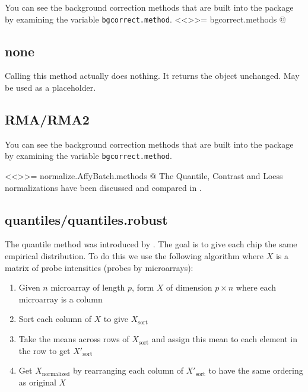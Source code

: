 You can see the background correction methods that are built into the package by examining the variable \verb+bgcorrect.method+.
<<>>=
bgcorrect.methods
@

\subsection{none}

Calling this method actually does nothing. It returns the object unchanged. May be used as a placeholder.

\subsection{RMA/RMA2}




You can see the background correction methods that are built into the package
by examining the variable \verb+bgcorrect.method+.

<<>>=
normalize.AffyBatch.methods
@
The Quantile, Contrast and Loess normalizations have been discussed and compared in \cite{PMID_12538238}.

\subsection{quantiles/quantiles.robust}

The quantile method was introduced by \cite{PMID_12538238}. The goal is to give each chip the same empirical distribution. To do this we use the following algorithm where $X$ is a matrix of probe intensities (probes by microarrays):

\begin{enumerate}
\item Given $n$ microarray of length $p$, form $X$  of dimension $p \times n$  where
each microarray is a column
\item Sort each column of $X$ to give $X_{\mbox{sort}}$
\item Take the means across rows of $X_{\mbox{sort}}$ and assign this mean to each element in the row to get $X'_{\mbox{sort}}$
\item Get $X_{\mbox{normalized}}$ by rearranging each column of $X'_{\mbox{sort}}$ to have the same ordering as original $X$
\end{enumerate}

